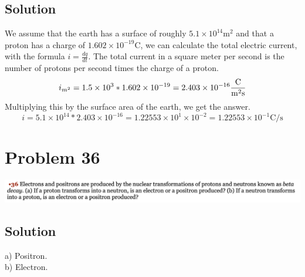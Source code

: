 \documentclass[12pt]{article}
\begin{document}
\subsection*{Solution}
We assume that the earth has a surface of roughly $5.1 \times 10^{14} \unit{\meter^2}$ and that a proton has a charge of $1.602 \times 10^{-19} \unit{\coulomb}$, we can calculate the total electric current, with the formula $i = \frac{dq}{dt}$. The total current in a square meter per second is the number of protons per second times the charge of a proton.
\begin{equation*}
    i_{m^2} = 1.5 \times 10^3 * 1.602 \times 10^{-19} = 2.403 \times 10^{-16} \unit{\frac{\coulomb}{\meter^2 \second}}
\end{equation*}
Multiplying this by the surface area of the earth, we get the answer.
\begin{equation*}
    i = 5.1 \times 10^{14} * 2.403 \times 10^{-16} = 1.22553 \times 10^1 \times 10^{-2} = \boxed{1.22553 \times 10^{-1} \unit{\coulomb/\second}}
\end{equation*}

\pagebreak
\section*{Problem 36}
\includegraphics[width=\textwidth]{picture_8.png} 

\subsection*{Solution}
a) Positron. \\
b) Electron.
\end{document}
